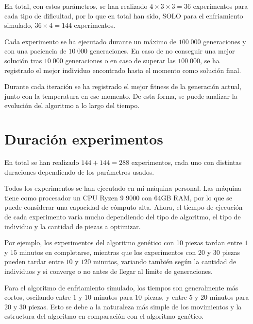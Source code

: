 \documentclass[11pt,spanish,listoffigures,listoftables]{tfgetsinf}
\begin{document}
En total, con estos parámetros, se han realizado $4 \times 3 \times 3 = 36$ experimentos para cada tipo de dificultad, por lo que en total han sido, SOLO para el enfriamiento simulado, $36 \times 4 = 144$ experimentos.

Cada experimento se ha ejecutado durante un máximo de $100\;000$ generaciones y con una paciencia de $10\;000$ generaciones. En caso de no conseguir una mejor solución tras $10\;000$ generaciones o en caso de superar las $100\;000$, se ha registrado el mejor individuo encontrado hasta el momento como solución final.

Durante cada iteración se ha registrado el mejor fitness de la generación actual, junto con la temperatura en ese momento. De esta forma, se puede analizar la evolución del algoritmo a lo largo del tiempo.

\section{Duración experimentos}
En total se han realizado $144 + 144 = 288$ experimentos, cada uno con distintas duraciones dependiendo de los parámetros usados.

Todos los experimentos se han ejecutado en mi máquina personal. Las máquina tiene como procesador un CPU Ryzen 9 9000 con 64GB RAM, por lo que se puede considerar una capacidad de cómputo alta. Ahora, el tiempo de ejecución de cada experimento varía mucho dependiendo del tipo de algoritmo, el tipo de individuo y la cantidad de piezas a optimizar. 

Por ejemplo, los experimentos del algoritmo genético con 10 piezas tardan entre $1$ y $15$ minutos en completarse, mientras que los experimentos con 20 y 30 piezas pueden tardar entre $10$ y $120$ minutos, variando también según la cantidad de individuos y si converge o no antes de llegar al límite de generaciones.

Para el algoritmo de enfriamiento simulado, los tiempos son generalmente más cortos, oscilando entre $1$ y $10$ minutos para 10 piezas, y entre $5$ y $20$ minutos para 20 y 30 piezas. Esto se debe a la naturaleza más simple de los movimientos y la estructura del algoritmo en comparación con el algoritmo genético.

\end{document}
